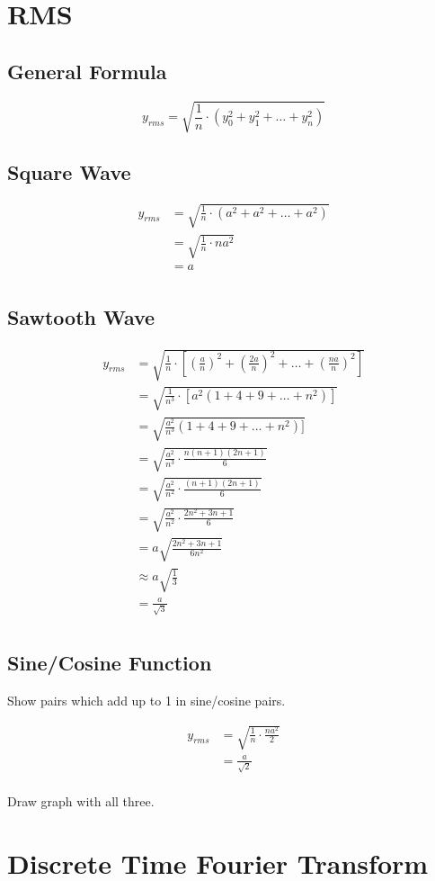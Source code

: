 \documentclass{exam}
\begin{document}
  \section{RMS}

  \subsection{General Formula}
  \[
    y_{rms} = \sqrt{\frac{1}{n} \cdot \left( y_0^2 + y_1^2 + \ldots + y_n^2 \right) }
  \]

  \subsection{Square Wave}
  \begin{align*}
    y_{rms} & = \sqrt{\frac{1}{n} \cdot \left( a^2 + a^2 + \ldots + a^2 \right) } \\
            & = \sqrt{\frac{1}{n} \cdot na^2 } \\
            & = a \\
  \end{align*}

  \subsection{Sawtooth Wave}
  \begin{align*}
    y_{rms} & = \sqrt{\frac{1}{n} \cdot \left[ \left( \frac{a}{n} \right)^2 + \left( \frac{2a}{n} \right)^2 
        + \ldots + \left( \frac{na}{n} \right)^2 \right ] } \\
            & = \sqrt{\frac{1}{n^3} \cdot \left[ a^2 ( 1 + 4 + 9 + \dots + n^2 ) \right] } \\
            & = \sqrt{\frac{a^2}{n^3} ( 1 + 4 + 9 + \dots + n^2 ) ] } \\
            & = \sqrt{\frac{a^2}{n^3} \cdot \frac{n(n + 1)(2n + 1)}{6} } \\
            & = \sqrt{\frac{a^2}{n^2} \cdot \frac{(n + 1)(2n + 1)}{6} } \\
            & = \sqrt{\frac{a^2}{n^2} \cdot \frac{2n^2 + 3n + 1}{6} } \\
            & = a \sqrt{ \frac{2n^2 + 3n + 1}{6n^2} } \\
            & \approx a \sqrt{ \frac{1}{3} } \\
            & = \frac{a}{\sqrt{3}} \\
  \end{align*}

  \subsection{Sine/Cosine Function}
  Show pairs which add up to 1 in sine/cosine pairs.

  \begin{align*}
    y_{rms} & = \sqrt{\frac{1}{n} \cdot \frac{na^2}{2} } \\
            & = \frac{a}{\sqrt{2}} \\
  \end{align*}

  Draw graph with all three.

  \section{Discrete Time Fourier Transform}
\end{document}

